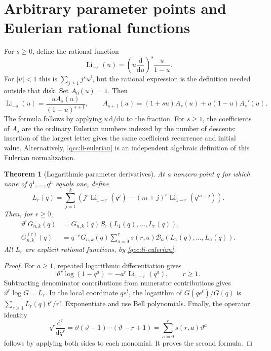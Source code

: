 \documentclass[11pt,a4paper,oneside,openany]{book}
\newtheorem{theorem}{Theorem}[chapter]
\theoremstyle{definition}
\theoremstyle{remark}
\newcommand{\Y}[1]{\mathcal B_{#1}}
\DeclareMathOperator{\Li}{Li}
\newcommand{\logq}{\vartheta}
\begin{document}
\section{Arbitrary parameter points and Eulerian rational functions}
For \(s\ge0\), define the rational function
\[
 \Li_{-s}(u)=\left(u\frac{\mathrm d}{\mathrm du}\right)^s\frac{u}{1-u}.
\]
For \(|u|<1\) this is \(\sum_{j\ge1}j^su^j\), but the rational
expression is the definition needed outside that disk. Set \(A_0(u)=1\).
Then
\begin{equation}\label{qcc:li-eulerian}
 \Li_{-s}(u)=\frac{uA_s(u)}{(1-u)^{s+1}},\qquad
 A_{s+1}(u)=(1+su)A_s(u)+u(1-u)A_s'(u).
\end{equation}
The formula follows by applying \(u\,\mathrm d/\mathrm du\) to the
fraction. For \(s\ge1\), the coefficients of \(A_s\) are the ordinary
Eulerian numbers indexed by the number of descents: insertion of the largest
letter gives the same coefficient recurrence and initial value. Alternatively,
\eqref{qcc:li-eulerian} is an independent algebraic definition of this
Eulerian normalization.

\begin{theorem}[Logarithmic parameter derivatives]\label{qcc:generic-jets}
At a nonzero point \(q\) for which none of \(q^1,\ldots,q^n\) equals
one, define
\begin{equation}\label{qcc:L-r}
 L_r(q)=\sum_{j=1}^{k}
 \left(j^r\Li_{1-r}(q^j)-(m+j)^r\Li_{1-r}(q^{m+j})\right).
\end{equation}
Then, for \(r\ge0\),
\begin{align}
 \logq^rG_{n,k}(q)&=G_{n,k}(q)\Y r(L_1(q),\ldots,L_r(q)),
          \label{qcc:theta-jets}\\
 G_{n,k}^{(r)}(q)&=q^{-r}G_{n,k}(q)
       \sum_{a=0}^r s(r,a)\Y a(L_1(q),\ldots,L_a(q)).
          \label{qcc:q-jets}
\end{align}
All \(L_r\) are explicit rational functions, by
\eqref{qcc:li-eulerian}.
\end{theorem}
\begin{proof}
For \(a\ge1\), repeated logarithmic differentiation gives
\[
 \logq^r\log(1-q^a)=-a^r\Li_{1-r}(q^a),\qquad r\ge1.
\]
Subtracting denominator contributions from numerator contributions gives
\(\logq^r\log G=L_r\). In the local coordinate \(q e^t\), the
logarithm of \(G(qe^t)/G(q)\) is
\(\sum_{r\ge1}L_r(q)t^r/r!\). Exponentiate and use Bell polynomials.
Finally, the operator identity
\begin{equation}\label{qcc:stirling-operators}
 q^r\frac{\mathrm d^r}{\mathrm dq^r}
 =\logq(\logq-1)\cdots(\logq-r+1)
 =\sum_{a=0}^r s(r,a)\logq^a
\end{equation}
follows by applying both sides to each monomial. It proves the second formula.
\end{proof}
\end{document}
